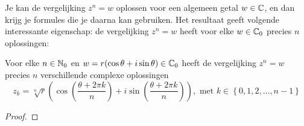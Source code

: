 \documentclass{ximera}
\begin{document}
Je kan de vergelijking $z^n=w$ oplossen voor een algemeen getal $w\in\mathbb{C}$, en dan krijg je formules die je daarna kan gebruiken. 
Het resultaat geeft volgende interessante eigenschap: de vergelijking $z^n=w$ heeft voor elke $w\in\mathbb{C}_0$ precies $n$ oplossingen:

\begin{proposition}
    Voor elke $n\in\mathbb{N}_0$ en $w=r(\cos\theta+i\sin\theta) \in\mathbb{C}_0$ heeft de vergelijking $z^n = w$ precies $n$ verschillende complexe oplossingen
    $$
    z_k = \sqrt[n]{r}\left( \cos\left( \frac{\theta + 2\pi k}{n}\right) + i\sin\left( \frac{\theta + 2\pi k}{n}\right) \right), \text{ met } k\in\left\{0,1,2,\ldots,n-1\right\}
    $$
\end{proposition}
\begin{proof}
\end{proof}

\end{document}

